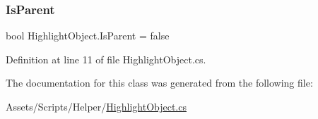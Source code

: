 \subsubsection{\texorpdfstring{Is\+Parent}{IsParent}}
{\footnotesize\ttfamily bool Highlight\+Object.\+Is\+Parent = false}



Definition at line 11 of file Highlight\+Object.\+cs.



The documentation for this class was generated from the following file\+:\begin{DoxyCompactItemize}
\item 
Assets/\+Scripts/\+Helper/\mbox{\hyperlink{_highlight_object_8cs}{Highlight\+Object.\+cs}}\end{DoxyCompactItemize}
